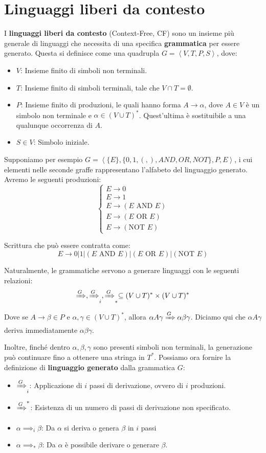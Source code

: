 \section{Linguaggi liberi da contesto}
I \textbf{linguaggi liberi da contesto} (Context-Free, CF) sono un insieme più generale di linguaggi che necessita di una specifica \textbf{grammatica}
per essere generato. Questa si definisce come una quadrupla $G = \left<V, T, P, S\right>$, dove: \begin{itemize}
    \item $V$: Insieme finito di simboli non terminali.
    \item $T$: Insieme finito di simboli terminali, tale che $V\cap T = \emptyset$.
    \item $P$: Insieme finito di produzioni, le quali hanno forma $A\to\alpha$, dove $A\in V$ è un simbolo non terminale e $\alpha\in (V\cup T)^*$.
        Quest'ultima è sostituibile a una qualunque occorrenza di $A$.
    \item $S\in V$: Simbolo iniziale.
\end{itemize}

\noindent Supponiamo per esempio $G = \left<\{E\}, \{0, 1, (, ), AND, OR, NOT\}, P, E \right>$, i cui elementi nelle seconde graffe rappresentano
l'alfabeto del linguaggio generato. Avremo le seguenti produzioni: \[ \begin{cases}
    E\to 0\\
    E\to 1\\
    E\to (E \text{ AND } E)\\
    E\to (E \text{ OR } E)\\
    E\to (\text{NOT } E)
\end{cases} \]

\noindent Scrittura che può essere contratta come: \[
    E\to 0|1|(E \text{ AND } E)|(E \text{ OR } E)|(\text{NOT } E)
\]

\noindent Naturalmente, le grammatiche servono a generare linguaggi con le seguenti relazioni: \[
    \xRightarrow{G}, \xRightarrow{G}_i, \xRightarrow{G}_* \subseteq (V\cup T)^*\times (V\cup T)^*
\]

\noindent Dove se $A\to \beta\in P$ e $\alpha, \gamma\in (V\cup T)^*$, allora $\alpha A \gamma \xRightarrow{G} \alpha \beta \gamma$. Diciamo qui che
$\alpha A \gamma$ deriva immediatamente $\alpha \beta \gamma$.\par
Inoltre, finché dentro $\alpha, \beta, \gamma$ sono presenti simboli non terminali, la generazione può continuare fino a ottenere una stringa in $T^*$.
Possiamo ora fornire la definizione di \textbf{linguaggio generato} dalla grammatica $G$: \begin{itemize}
    \item $\xRightarrow{G}_i$: Applicazione di $i$ passi di derivazione, ovvero di $i$ produzioni.
    \item $\xRightarrow{G}^*$: Esistenza di un numero di passi di derivazione non specificato.
    \item $\alpha\implies_i \beta$: Da $\alpha$ si deriva o genera $\beta$ in $i$ passi
    \item $\alpha\implies_* \beta$: Da $\alpha$ è possibile derivare o generare $\beta$.
\end{itemize}

